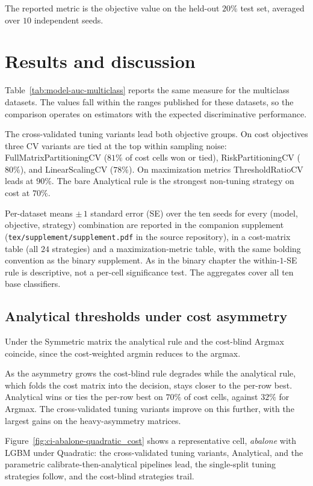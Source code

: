 The reported metric is the objective value on the held-out $20\%$ test set, averaged over $10$ independent seeds.

\section{Results and discussion}

Table~\ref{tab:model-auc-multiclass} reports the same measure for the multiclass datasets. The values fall within the ranges published for these datasets, so the comparison operates on estimators with the expected discriminative performance.



The cross-validated tuning variants lead both objective groups. On cost objectives three CV variants are tied at the top within sampling noise: FullMatrixPartitioningCV ($81\%$ of cost cells won or tied), RiskPartitioningCV ($80\%$), and LinearScalingCV ($78\%$). On maximization metrics ThresholdRatioCV leads at $90\%$. The bare Analytical rule is the strongest non-tuning strategy on cost at $70\%$.

Per-dataset means $\pm\,1$ standard error (SE) over the ten seeds for every (model, objective, strategy) combination are reported in the companion supplement (\texttt{tex/supplement/supplement.pdf} in the source repository), in a cost-matrix table (all $24$ strategies) and a maximization-metric table, with the same bolding convention as the binary supplement. As in the binary chapter the within-$1$-SE rule is descriptive, not a per-cell significance test. The aggregates cover all ten base classifiers.

\subsection{Analytical thresholds under cost asymmetry}

Under the Symmetric matrix the analytical rule and the cost-blind Argmax coincide, since the cost-weighted argmin reduces to the argmax.

As the asymmetry grows the cost-blind rule degrades while the analytical rule, which folds the cost matrix into the decision, stays closer to the per-row best. Analytical wins or ties the per-row best on $70\%$ of cost cells, against $32\%$ for Argmax. The cross-validated tuning variants improve on this further, with the largest gains on the heavy-asymmetry matrices.

Figure~\ref{fig:ci-abalone-quadratic_cost} shows a representative cell, \textit{abalone} with LGBM under Quadratic: the cross-validated tuning variants, Analytical, and the parametric calibrate-then-analytical pipelines lead, the single-split tuning strategies follow, and the cost-blind strategies trail.

